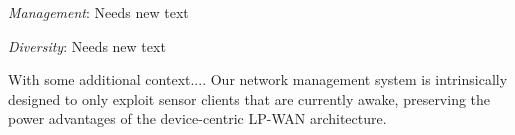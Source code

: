 
{\color{blue} \emph{Management}: Needs new text}


{\color{blue}\emph{Diversity}: Needs new text}


{\color{blue} With some additional context....}
Our network management system is intrinsically designed to only exploit sensor clients that are currently awake, preserving the power advantages of the device-centric LP-WAN architecture. 

